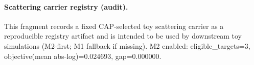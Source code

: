 \paragraph{Scattering carrier registry (audit).} \AuditTag This fragment records a fixed CAP-selected toy scattering carrier as a reproducible registry artifact and is intended to be used by downstream toy simulations (M2-first; M1 fallback if missing). M2 enabled: eligible\_targets=3, objective(mean abs-log)=0.024693, gap=0.000000.